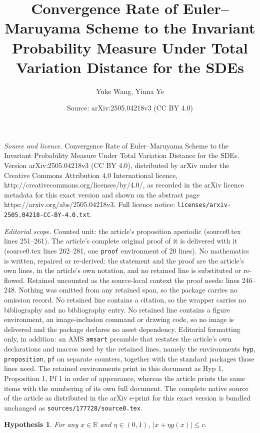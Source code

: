 \documentclass[10pt,a4paper]{amsart}
\title{Convergence Rate of Euler--Maruyama Scheme to the Invariant Probability Measure Under Total Variation Distance for the SDEs}
\author{Yuke Wang, Yinna Ye}
\date{Source: arXiv:2505.04218v3 (CC BY 4.0)}
\newtheorem{hyp}{Hypothesis}
\def\R{\mathbb{R}}
\def\leq{\leqslant}
\begin{document}
\maketitle

\noindent\emph{Source and licence.} Convergence Rate of Euler--Maruyama Scheme to the Invariant Probability Measure Under Total Variation Distance for the SDEs. Version arXiv:2505.04218v3 (CC BY 4.0), distributed by arXiv under the Creative Commons Attribution 4.0 International licence, http://creativecommons.org/licenses/by/4.0/, as recorded in the arXiv licence metadata for this exact version and shown on the abstract page https://arxiv.org/abs/2505.04218v3. Full licence notice: \texttt{licenses/arxiv-2505.04218-CC-BY-4.0.txt}.\par\smallskip

\noindent\textit{Editorial scope.} Counted unit: the article's proposition aperiodic (source0.tex lines 251--261). The article's complete original proof of it is delivered with it (source0.tex lines 262--281, one \texttt{proof} environment of 20 lines). No mathematics is written, repaired or re-derived: the statement and the proof are the article's own lines, in the article's own notation, and no retained line is substituted or re-flowed.  Retained uncounted as the source-local context the proof needs: lines 246--248.  Nothing was omitted from any retained span, so the package carries no omission record.  No retained line contains a citation, so the wrapper carries no bibliography and no bibliography entry.  No retained line contains a figure environment, an image-inclusion command or drawing code, so no image is delivered and the package declares no asset dependency.  Editorial formatting only, in addition: an AMS \texttt{amsart} preamble that restates the article's own declarations and macros used by the retained lines, namely the environments \texttt{hyp}, \texttt{proposition}, \texttt{pf} on separate counters, together with the standard packages those lines need.  The retained environments print in this document as Hyp 1, Proposition 1, Pf 1 in order of appearance, whereas the article prints the same items with the numbering of its own full document.  The complete native source of the article as distributed in the arXiv e-print for this exact version is bundled unchanged as \texttt{sources/177728/source0.tex}.
\begin{hyp}\label{hyp2}\label{assump2}
	For any $x\in\R$ and $\eta\in(0,1)$, $|x+\eta g(x)|\leq c.$
\end{hyp}
\end{document}
